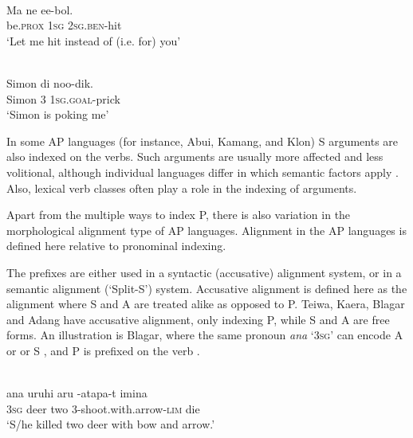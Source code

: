 {\ea%
\label{ex:1:11}
 \\
\gll Ma     ne   ee-bol. \\
 be.\textsc{prox}   \textsc{1sg}   \textsc{2sg.ben}{}-hit  \\
\glt  `Let me hit instead of (i.e. for) you'
\z
 





\ea%
\label{ex:1:12}
 \\
\gll Simon   di   noo-dik. \\
 Simon   3   \textsc{1sg.goal}{}-prick  \\
\glt `Simon is poking me'
\z
 




In some AP languages (for instance, Abui, Kamang, and Klon) S arguments are also indexed on the verbs. Such arguments are usually more affected and less volitional, although individual languages differ in which semantic factors apply \citep{FeddenEtAlthisvolume,FeddenEtAl2014}. Also, lexical verb classes often play a role in the indexing of arguments. 

Apart from the multiple ways to index P, there is also variation in the morphological alignment type of AP languages. Alignment in the AP languages is defined here relative to pronominal indexing. 

The prefixes are either used in a syntactic (accusative) alignment system, or in a semantic alignment (`Split-S') system. Accusative alignment is defined here as the alignment where S and A are treated alike as opposed to P. Teiwa, Kaera, Blagar and Adang have accusative alignment, only indexing P, while S and A are free forms. An illustration is Blagar, where the same pronoun \textit{{\textglotstop}}\textit{ana} `3\textsc{sg}' can encode A  or or S , and P is prefixed on the verb .



\ea%
\label{ex:1:13}
\\
\gll {\textglotstop}ana   uruhi{\ng}  aru {\textglotstop}-atapa-t       imina \\
 3\textsc{sg}  deer   two 3-shoot.with.arrow-\textsc{lim}  die  \\
\glt `S/he killed two deer with bow and arrow.'
\z







}
